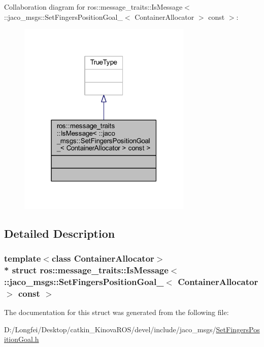 Collaboration diagram for ros\+:\+:message\+\_\+traits\+:\+:Is\+Message$<$ \+:\+:jaco\+\_\+msgs\+:\+:Set\+Fingers\+Position\+Goal\+\_\+$<$ Container\+Allocator $>$ const $>$\+:
\nopagebreak
\begin{figure}[H]
\begin{center}
\leavevmode
\includegraphics[width=235pt]{d4/d9b/structros_1_1message__traits_1_1IsMessage_3_01_1_1jaco__msgs_1_1SetFingersPositionGoal___3_01Con7a8fbd54f0f94293912f7fed9698c4f3}
\end{center}
\end{figure}


\subsection{Detailed Description}
\subsubsection*{template$<$class Container\+Allocator$>$\\*
struct ros\+::message\+\_\+traits\+::\+Is\+Message$<$ \+::jaco\+\_\+msgs\+::\+Set\+Fingers\+Position\+Goal\+\_\+$<$ Container\+Allocator $>$ const  $>$}



The documentation for this struct was generated from the following file\+:\begin{DoxyCompactItemize}
\item 
D\+:/\+Longfei/\+Desktop/catkin\+\_\+\+Kinova\+R\+O\+S/devel/include/jaco\+\_\+msgs/\hyperlink{SetFingersPositionGoal_8h}{Set\+Fingers\+Position\+Goal.\+h}\end{DoxyCompactItemize}
